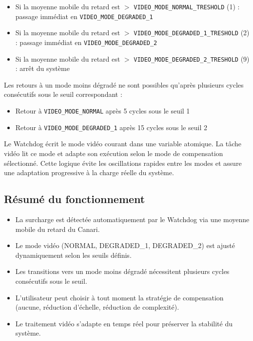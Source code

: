 \documentclass[a4paper,12pt]{article}
\begin{document}
\begin{itemize}
    \item Si la moyenne mobile du retard est $>$ \texttt{VIDEO\_MODE\_NORMAL\_TRESHOLD} (1) : passage immédiat en \texttt{VIDEO\_MODE\_DEGRADED\_1}
    \item Si la moyenne mobile du retard est $>$ \texttt{VIDEO\_MODE\_DEGRADED\_1\_TRESHOLD} (2) : passage immédiat en \texttt{VIDEO\_MODE\_DEGRADED\_2}
    \item Si la moyenne mobile du retard est $>$ \texttt{VIDEO\_MODE\_DEGRADED\_2\_TRESHOLD} (9) : arrêt du système
\end{itemize}

Les retours à un mode moins dégradé ne sont possibles qu'après plusieurs cycles consécutifs sous le seuil correspondant :

\begin{itemize}
    \item Retour à \texttt{VIDEO\_MODE\_NORMAL} après 5 cycles sous le seuil 1
    \item Retour à \texttt{VIDEO\_MODE\_DEGRADED\_1} après 15 cycles sous le seuil 2
\end{itemize}

Le Watchdog écrit le mode vidéo courant dans une variable atomique. La tâche vidéo lit ce mode et adapte son exécution selon le mode de compensation sélectionné. Cette logique évite les oscillations rapides entre les modes et assure une adaptation progressive à la charge réelle du système.

\break

\subsection{Résumé du fonctionnement}

\begin{itemize}
    \item La surcharge est détectée automatiquement par le Watchdog via une moyenne mobile du retard du Canari.
    \item Le mode vidéo (NORMAL, DEGRADED\_1, DEGRADED\_2) est ajusté dynamiquement selon les seuils définis.
    \item Les transitions vers un mode moins dégradé nécessitent plusieurs cycles consécutifs sous le seuil.
    \item L'utilisateur peut choisir à tout moment la stratégie de compensation (aucune, réduction d'échelle, réduction de complexité).
    \item Le traitement vidéo s'adapte en temps réel pour préserver la stabilité du système.
\end{itemize}
\end{document}
